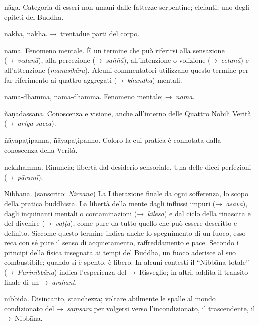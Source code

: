 \begin{glossarydescription}

\item[nāga.] Categoria di esseri non umani dalle fattezze serpentine;
  elefanti; uno degli epiteti del Buddha.

\item[nakha, nakhā.] →~trentadue parti del corpo.

\item[nāma.] Fenomeno mentale. È un termine che può riferirsi alla
  sensazione (→~\emph{vedanā}), alla percezione (→~\emph{saññā}), all'intenzione
  o volizione (→~\emph{cetanā}) e all'attenzione (\emph{manasikāra}). Alcuni
  commentatori utilizzano questo termine per far riferimento ai quattro
  aggregati (→~\emph{khandha}) mentali.

\item[nāma-dhamma, nāma-dhammā.] Fenomeno mentale; →~\emph{nāma}.

\item[ñāṇadassana.] Conoscenza e visione, anche all'interno delle Quattro
  Nobili Verità (→~\emph{ariya-sacca}).

\item[ñāyapaṭipanna, ñāyapaṭipanno.] Coloro la cui pratica è connotata
  dalla conoscenza della Verità.

\item[nekkhamma.] Rinuncia; libertà dal desiderio sensoriale. Una delle
  dieci perfezioni (→~\emph{pāramī}).

\item[Nibbāna.] (sanscrito: \emph{Nirvāṇa}) La Liberazione finale da ogni
  sofferenza, lo scopo della pratica buddhista. La libertà della mente dagli
  influssi impuri (→~\emph{āsava}), dagli inquinanti mentali o contaminazioni
  (→~\emph{kilesa}) e dal ciclo della rinascita e del divenire (→~\emph{vaṭṭa}),
  come pure da tutto quello che può essere descritto e definito. Siccome questo
  termine indica anche lo spegnimento di un fuoco, esso reca con sé pure il
  senso di acquietamento, raffreddamento e pace. Secondo i principi della fisica
  insegnata ai tempi del Buddha, un fuoco aderisce al suo combustibile; quando
  si è spento, è libero. In alcuni contesti il ``Nibbāna totale''
  (→~\emph{Parinibbāna}) indica l'esperienza del →~Risveglio; in altri, addita
  il transito finale di un →~\emph{arahant}.

\item[nibbidā.] Disincanto, stanchezza; voltare abilmente le spalle al
  mondo condizionato del →~\emph{saṃsāra} per volgersi verso l'incondizionato,
  il trascendente, il →~Nibbāna.


\end{glossarydescription}
